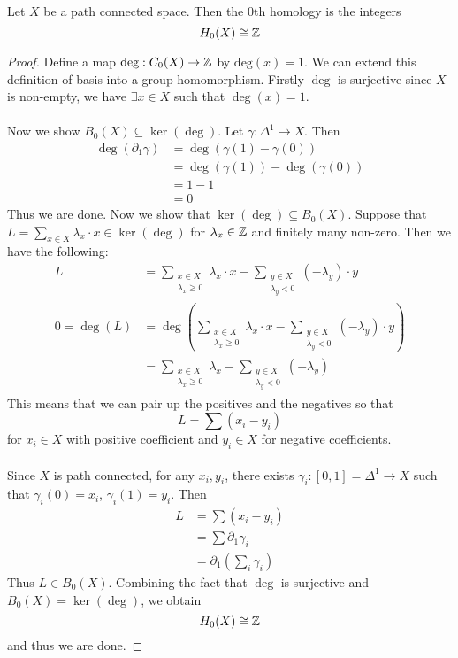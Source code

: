 \documentclass[a4paper]{article}
\begin{document}
\begin{lmm}{}{} Let $X$ be a path connected space. Then the $0$th homology is the integers $$H_0(X)\cong\mathbb{Z}$$ \tcbline
\begin{proof}
Define a map $\text{deg}:C_0(X)\to\mathbb{Z}$ by $\text{deg}(x)=1$. We can extend this definition of basis into a group homomorphism. Firstly $\deg$ is surjective since $X$ is non-empty, we have $\exists x\in X$ such that $\deg(x)=1$. \\~\\
Now we show $B_0(X)\subseteq\ker(\deg)$. Let $\gamma:\Delta^1\to X$. Then 
\begin{align*}
\deg(\partial_1\gamma)&=\deg(\gamma(1)-\gamma(0))\\
&=\deg(\gamma(1))-\deg(\gamma(0))\\
&=1-1\\
&=0
\end{align*}
Thus we are done. Now we show that $\ker(\deg)\subseteq B_0(X)$. Suppose that $L=\sum_{x\in X}\lambda_x\cdot x\in\ker(\deg)$ for $\lambda_x\in\mathbb{Z}$ and finitely many non-zero. Then we have the following: 
\begin{align*}
L&=\sum_{\substack{x\in X\\\lambda_x\geq 0}}\lambda_x\cdot x-\sum_{\substack{y\in X\\\lambda_y<0}}(-\lambda_y)\cdot y\\
0=\deg(L)&=\deg\left(\sum_{\substack{x\in X\\\lambda_x\geq 0}}\lambda_x\cdot x-\sum_{\substack{y\in X\\\lambda_y<0}}(-\lambda_y)\cdot y\right)\\
&=\sum_{\substack{x\in X\\\lambda_x\geq 0}}\lambda_x-\sum_{\substack{y\in X\\\lambda_y<0}}(-\lambda_y)
\end{align*}
This means that we can pair up the positives and the negatives so that $$L=\sum(x_i-y_i)$$ for $x_i\in X$ with positive coefficient and $y_i\in X$ for negative coefficients. \\~\\
Since $X$ is path connected, for any $x_i,y_i$, there exists $\gamma_i:[0,1]=\Delta^1\to X$ such that $\gamma_i(0)=x_i$, $\gamma_i(1)=y_i$. Then 
\begin{align*}
L&=\sum(x_i-y_i)\\
&=\sum\partial_1\gamma_i\\
&=\partial_1\left(\sum_i\gamma_i\right)
\end{align*}
Thus $L\in B_0(X)$. Combining the fact that $\deg$ is surjective and $B_0(X)=\ker(\deg)$, we obtain $$H_0(X)\cong\mathbb{Z}$$ and thus we are done. 
\end{proof}
\end{lmm}
\end{document}
